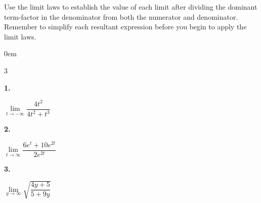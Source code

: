 \documentclass[12pt,]{book}
\theoremstyle{plain}
\theoremstyle{definition}
\numberwithin{equation}{section}
\newenvironment{exercisegroup}%
{\medskip\noindent}%
{\par\bigskip}%
\newlength{\exercisegroupindent}%
\newlength{\exercisegroupitemwidth}%
\newenvironment{exercisegrouplist}%
{\vspace{-\partopsep}%
\begin{adjustwidth}{\exercisegroupindent}{0em}}%
{\end{adjustwidth}%
\vspace{-\partopsep}%
\vspace{\baselineskip}}%
\newenvironment{exercisegroupbycol}[1]%
{\begin{exercisegrouplist}%
\vspace{-\multicolsep}%
\begin{multicols}{#1}%
\setlength{\parindent}{0em}%
\setlength{\exercisegroupitemwidth}{\linewidth}}%
{\end{multicols}%
\vspace{-\multicolsep}%
\end{exercisegrouplist}}%
\newenvironment{exercisegroupitem}[1]%
{\begin{minipage}[t]{\exercisegroupitemwidth}
\vspace{0pt}%
{\bfseries#1}%
\rule{0pt}{\baselineskip}}{\strut%
\end{minipage}%
\hspace{\columnsep}}%
\providecommand\phantomsection{}
\begin{document}
\begin{exercisegroup}%
Use the limit laws to establish the value of each limit after dividing the dominant term-factor in the denominator from both the numerator and denominator. Remember to simplify each resultant expression before you begin to apply the limit laws.%
\par
\begin{exercisegroupbycol}{3}%
\begin{exercisegroupitem}{1. }\phantomsection\hypertarget{exercise-86}{\null}
\(\lim\limits_{t\to-\infty}\dfrac{4t^2}{4t^2+t^3}\)%
\end{exercisegroupitem}%
\par%
\begin{exercisegroupitem}{2. }\phantomsection\hypertarget{exercise-87}{\null}
\(\lim\limits_{t\to\infty}\dfrac{6e^t+10e^{2t}}{2e^{2t}}\)%
\end{exercisegroupitem}%
\par%
\begin{exercisegroupitem}{3. }\phantomsection\hypertarget{exercise-88}{\null}
\(\lim\limits_{y\to\infty}\sqrt{\dfrac{4y+5}{5+9y}}\)%
\end{exercisegroupitem}%
\par%
\end{exercisegroupbycol}%
\end{exercisegroup}%
\typeout{************************************************}
\typeout{************************************************}
\end{document}

